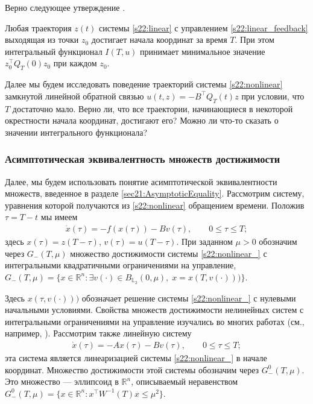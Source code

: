 \documentclass[../main.tex]{subfiles}
\begin{document}
Верно следующее утверждение \cite{Abgar,Kur1,GusevOsipov}.
\begin{utv}
Любая траектория $z(t)$ системы \eqref{s22:linear} с управлением  \eqref{s22:linear_feedback} выходящая из точки  $ z_0 $ достигает начала координат за время $T$. 
При этом интегральный функционал $I(T,u)$ принимает минимальное значение $z^{\top}_0 Q_T(0) z_0 $ при каждом $z_0$.
\end{utv}
Далее мы будем исследовать поведение траекторий системы \eqref{s22:nonlinear} замкнутой линейной обратной связью $ u(t,z) = -B^{\top} Q_T(t) z$ при условии, что  $T$ достаточно мало. 
Верно ли, что все траектории, начинающиеся в некоторой окрестности начала координат, достигают его?  
Можно ли что-то сказать о значении интегрального функционала? 

\subsubsection{Асимптотическая эквивалентность множеств достижимости}

Далее, мы будем использовать понятие асимптотической эквивалентности множеств, введенное в разделе \ref{sec21:AsymptoticEquality}. 
Рассмотрим систему, уравнения которой получаются из \eqref{s22:nonlinear} обращением времени. 
Положив $\tau=T-t$ мы имеем
\begin{gather}\label{s22:nonlinear_}
            \dot{x}(\tau)=-f(x(\tau))-B v(\tau),\qquad 0 \leqslant \tau \leqslant T; 
\end{gather}
здесь $x(\tau)=z(T-\tau)$, $v(\tau)=u(T-\tau)$.
При заданном $\mu>0$ обозначим через $ G_{-} (T,\mu)$ множество достижимости системы \eqref{s22:nonlinear_} с интегральными квадратичными ограничениями на управление, $G_{-}(T,\mu)=\{x\in \mathbb{R}^n:\exists v(\cdot)\in B_{\mathbb{L}_2}(0,\mu),\; x=x( T,v(\cdot)))\}$.
         
Здесь $x( \tau,v(\cdot)))$ обозначает решение системы  \eqref{s22:nonlinear_} с нулевыми начальными условиями. 
Свойства множеств достижимости нелинейных систем с интегральными ограничениями на управление изучались во многих работах (см., например, \cite{Guseinov,Rousse,GusZykIFAC}).
Рассмотрим также линейную систему 
\begin{gather}\label{s22:linear_}
            \dot{x}(\tau)=-Ax(\tau)-B v(\tau),\qquad 0 \leqslant \tau \leqslant T; 
\end{gather}
эта система является линеаризацией системы  \eqref{s22:nonlinear_} в начале координат. 
Множество достижимости этой системы обозначим через $G_{-}^0(T,\mu)$. 
Это множество --- эллипсоид в $\mathbb{R}^n$, описываемый неравенством $G_{-}^0(T,\mu)=\{x \in \mathbb{R}^n: x^\top W^{-1}(T)x\leqslant \mu^2\}$.            
\end{document}
